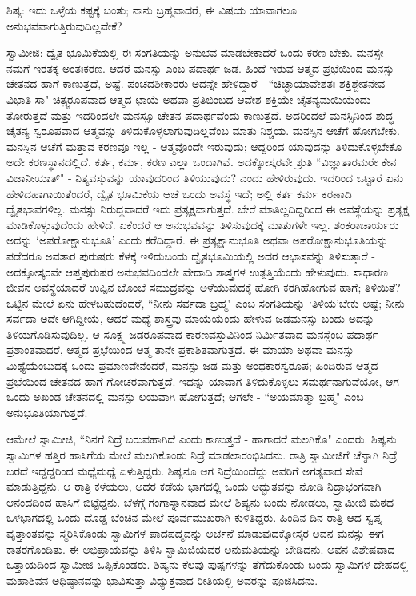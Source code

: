 ಶಿಷ್ಯ: ಇದು ಒಳ್ಳೆಯ ಕಷ್ಟಕ್ಕೆ ಬಂತು; ನಾನು ಬ್ರಹ್ಮವಾದರೆ, ಈ ವಿಷಯ ಯಾವಾಗಲೂ ಅನುಭವವಾಗುತ್ತಿರುವುದಿಲ್ಲವೇಕೆ?

ಸ್ವಾಮೀಜಿ: ದ್ವೈತ ಭೂಮಿಕೆಯಲ್ಲಿ ಈ ಸಂಗತಿಯನ್ನು ಅನುಭವ ಮಾಡಬೇಕಾದರೆ ಒಂದು ಕರಣ ಬೇಕು. ಮನಸ್ಸೇ ನಮಗೆ ಇರತಕ್ಕ ಅಂತಃಕರಣ. ಆದರೆ ಮನಸ್ಸು ಎಂಬ ಪದಾರ್ಥ ಜಡ. ಹಿಂದೆ ಇರುವ ಆತ್ಮದ ಪ್ರಭೆಯಿಂದ ಮನಸ್ಸು ಚೇತನದ ಹಾಗೆ ಕಾಣುತ್ತದೆ, ಅಷ್ಟೆ. ಪಂಚದಶೀಕಾರರು ಅದನ್ನೇ ಹೇಳಿದ್ದಾರೆ - “ಚಿಚ್ಛಾಯಾವೇಶತಃ ಶಕ್ತಿಶ್ಚೇತನೇವ ವಿಭಾತಿ ಸಾ" ಚಿತ್ಸ್ವರೂಪವಾದ ಆತ್ಮದ ಛಾಯೆ ಅಥವಾ ಪ್ರತಿಬಿಂಬದ ಆವೇಶ ಶಕ್ತಿಯೇ ಚೈತನ್ಯಮಯಿಯೆಂದು ತೋರುತ್ತದೆ ಮತ್ತು ಇದರಿಂದಲೇ ಮನಸ್ಸೂ ಚೇತನ ಪದಾರ್ಥವೆಂದು ಕಾಣುತ್ತದೆ. ಅದರಿಂದಲೆ ಮನಸ್ಸಿನಿಂದ ಶುದ್ಧ ಚೈತನ್ಯ ಸ್ವರೂಪವಾದ ಆತ್ಮವನ್ನು ತಿಳಿದುಕೊಳ್ಳಲಾಗುವುದಿಲ್ಲವೆಂಬ ಮಾತು ನಿಶ್ಚಯ. ಮನಸ್ಸಿನ ಆಚೆಗೆ ಹೋಗಬೇಕು. ಮನಸ್ಸಿನ ಆಚೆಗೆ ಮತ್ತಾವ ಕರಣವೂ ಇಲ್ಲ - ಆತ್ಮವೊಂದೇ ಇರುವುದು; ಆದ್ದರಿಂದ ಯಾವುದನ್ನು ತಿಳಿದುಕೊಳ್ಳಬೇಕೊ ಅದೇ ಕರಣಸ್ಥಾನದಲ್ಲಿದೆ. ಕರ್ತ, ಕರ್ಮ, ಕರಣ ಎಲ್ಲಾ ಒಂದಾಗಿವೆ. ಅದಕ್ಕೋಸ್ಕರವೇ ಶ್ರುತಿ “ವಿಜ್ಞಾತಾರಮರೇ ಕೇನ ವಿಜಾನೀಯಾತ್" - ನಿತ್ಯವಸ್ತುವನ್ನು ಯಾವುದರಿಂದ ತಿಳಿಯುವುದು? ಎಂದು ಹೇಳಿರುವುದು. ಇದರಿಂದ ಒಟ್ಟಾರೆ ಏನು ಹೇಳಿದಹಾಗಾಯಿತೆಂದರೆ, ದ್ವೈತ ಭೂಮಿಕೆಯ ಆಚೆ ಒಂದು ಅವಸ್ಥೆ ಇದೆ; ಅಲ್ಲಿ ಕರ್ತ ಕರ್ಮ ಕರಣಾದಿ ದ್ವೈತಭಾವಗಳಿಲ್ಲ. ಮನಸ್ಸು ನಿರುದ್ಧವಾದರೆ ಇದು ಪ್ರತ್ಯಕ್ಷವಾಗುತ್ತದೆ. ಬೇರೆ ಮಾತಿಲ್ಲದಿದ್ದರಿಂದ ಈ ಅವಸ್ಥೆಯನ್ನು ಪ್ರತ್ಯಕ್ಷ ಮಾಡಿಕೊಳ್ಳುವುದೆಂದು ಹೇಳಿದೆ. ಏಕೆಂದರೆ ಆ ಅನುಭವವನ್ನು ತಿಳಿಸುವುದಕ್ಕೆ ಮಾತುಗಳೇ ಇಲ್ಲ. ಶಂಕರಾಚಾರ್ಯರು ಅದನ್ನು ‘ಅಪರೋಕ್ಷಾನುಭೂತಿ’ ಎಂದು ಕರೆದಿದ್ದಾರೆ. ಈ ಪ್ರತ್ಯಕ್ಷಾನುಭೂತಿ ಅಥವಾ ಅಪರೋಕ್ಷಾನುಭೂತಿಯನ್ನು ಪಡೆದರೂ ಅವತಾರ ಪುರುಷರು ಕೆಳಕ್ಕೆ ಇಳಿದುಬಂದು ದ್ವೈತಭೂಮಿಯಲ್ಲಿ ಅದರ ಆಭಾಸವನ್ನು ತಿಳಿಸುತ್ತಾರೆ - ಅದಕ್ಕೋಸ್ಕರವೇ ಆಪ್ತಪುರುಷರ ಅನುಭವದಿಂದಲೇ ವೇದಾದಿ ಶಾಸ್ತ್ರಗಳ ಉತ್ಪತ್ತಿಯೆಂದು ಹೇಳುವುದು. ಸಾಧಾರಣ ಜೀವನ ಅವಸ್ಥೆಯಾದರೆ ಉಪ್ಪಿನ ಬೊಂಬೆ ಸಮುದ್ರವನ್ನು ಅಳೆಯುವುದಕ್ಕೆ ಹೋಗಿ ಕರಗಿಹೋಗುವ ಹಾಗೆ; ತಿಳಿಯಿತೆ? ಒಟ್ಟಿನ ಮೇಲೆ ಏನು ಹೇಳಬಹುದೆಂದರೆ, “ನೀನು ಸರ್ವದಾ ಬ್ರಹ್ಮ" ಎಂಬ ಸಂಗತಿಯನ್ನು ‘ತಿಳಿಯ’ಬೇಕು ಅಷ್ಟೆ; ನೀನು ಸರ್ವದಾ ಅದೇ ಆಗಿದ್ದೀಯೆ, ಆದರೆ ಮಧ್ಯೆ ಶಾಸ್ತ್ರವು ಮಾಯೆಯೆಂದು ಹೇಳುವ ಜಡಮನಸ್ಸು ಬಂದು ಅದನ್ನು ತಿಳಿಯಗೊಡಿಸುವುದಿಲ್ಲ. ಆ ಸೂಕ್ಷ್ಮ ಜಡರೂಪವಾದ ಕಾರಣವಸ್ತುವಿನಿಂದ ನಿರ್ಮಿತವಾದ ಮನಸ್ಸೆಂಬ ಪದಾರ್ಥ ಪ್ರಶಾಂತವಾದರೆ, ಆತ್ಮದ ಪ್ರಭೆಯಿಂದ ಆತ್ಮ ತಾನೇ ಪ್ರಕಾಶಿತವಾಗುತ್ತದೆ. ಈ ಮಾಯಾ ಅಥವಾ ಮನಸ್ಸು ಮಿಥ್ಯೆಯೆಂಬುದಕ್ಕೆ ಒಂದು ಪ್ರಮಾಣವೇನೆಂದರೆ, ಮನಸ್ಸು ಜಡ ಮತ್ತು ಅಂಧಕಾರಸ್ವರೂಪ; ಹಿಂದಿರುವ ಆತ್ಮದ ಪ್ರಭೆಯಿಂದ ಚೇತನದ ಹಾಗೆ ಗೋಚರವಾಗುತ್ತದೆ. ಇದನ್ನು ಯಾವಾಗ ತಿಳಿದುಕೊಳ್ಳಲು ಸಮರ್ಥನಾಗುವೆಯೋ, ಆಗ ಒಂದು ಅಖಂಡ ಚೇತನದಲ್ಲಿ ಮನಸ್ಸು ಲಯವಾಗಿ ಹೋಗುತ್ತದೆ; ಆಗಲೇ - “ಅಯಮಾತ್ಮಾ ಬ್ರಹ್ಮ" ಎಂಬ ಅನುಭೂತಿಯಾಗುತ್ತದೆ.

ಆಮೇಲೆ ಸ್ವಾಮೀಜಿ, “ನಿನಗೆ ನಿದ್ರೆ ಬರುವಹಾಗಿದೆ ಎಂದು ಕಾಣುತ್ತದೆ - ಹಾಗಾದರೆ ಮಲಗಿಕೊ" ಎಂದರು. ಶಿಷ್ಯನು ಸ್ವಾಮಿಗಳ ಹತ್ತಿರ ಹಾಸಿಗೆಯ ಮೇಲೆ ಮಲಗಿಕೊಂಡು ನಿದ್ರೆ ಮಾಡಲಾರಂಭಿಸಿದನು. ರಾತ್ರಿ ಸ್ವಾಮೀಜಿಗೆ ಚೆನ್ನಾಗಿ ನಿದ್ರೆ ಬರದೆ ಇದ್ದದ್ದರಿಂದ ಮಧ್ಯೆಮಧ್ಯೆ ಏಳುತ್ತಿದ್ದರು. ಶಿಷ್ಯನೂ ಆಗ ನಿದ್ರೆಯಿಂದೆದ್ದು ಅವರಿಗೆ ಅಗತ್ಯವಾದ ಸೇವೆ ಮಾಡುತ್ತಿದ್ದನು. ಆ ರಾತ್ರಿ ಕಳೆಯಲು, ಅದರ ಕಡೆಯ ಭಾಗದಲ್ಲಿ ಒಂದು ಅದ್ಭುತವನ್ನು ನೋಡಿ ನಿದ್ರಾಭಂಗವಾಗಿ ಆನಂದದಿಂದ ಹಾಸಿಗೆ ಬಿಟ್ಟೆದ್ದನು. ಬೆಳಗ್ಗೆ ಗಂಗಾಸ್ನಾನವಾದ ಮೇಲೆ ಶಿಷ್ಯನು ಬಂದು ನೋಡಲು, ಸ್ವಾಮೀಜಿ ಮಠದ ಒಳಭಾಗದಲ್ಲಿ ಒಂದು ದೊಡ್ಡ ಬೆಂಚಿನ ಮೇಲೆ ಪೂರ್ವಮುಖರಾಗಿ ಕುಳಿತಿದ್ದರು. ಹಿಂದಿನ ದಿನ ರಾತ್ರಿ ಆದ ಸ್ವಪ್ನ ವೃತ್ತಾಂತವನ್ನು ಸ್ಮರಿಸಿಕೊಂಡು ಸ್ವಾಮಿಗಳ ಪಾದಪದ್ಮವನ್ನು ಅರ್ಚನೆ ಮಾಡುವುದಕ್ಕೋಸ್ಕರ ಅವನ ಮನಸ್ಸು ಈಗ ಕಾತರಗೊಂಡಿತು. ಈ ಅಭಿಪ್ರಾಯವನ್ನು ತಿಳಿಸಿ ಸ್ವಾಮಿಜಿಯವರ ಅನುಮತಿಯನ್ನು ಬೇಡಿದನು. ಅವನ ವಿಶೇಷವಾದ ಒತ್ತಾಯದಿಂದ ಸ್ವಾಮೀಜಿ ಒಪ್ಪಿಕೊಂಡರು. ಶಿಷ್ಯನು ಕೆಲವು ಪುಷ್ಪಗಳನ್ನು ತೆಗೆದುಕೊಂಡು ಬಂದು ಸ್ವಾಮಿಗಳ ದೇಹದಲ್ಲಿ ಮಹಾಶಿವನ ಅಧಿಷ್ಠಾನವನ್ನು ಭಾವಿಸುತ್ತಾ ವಿಧ್ಯುಕ್ತವಾದ ರೀತಿಯಲ್ಲಿ ಅವರನ್ನು ಪೂಜಿಸಿದನು.

